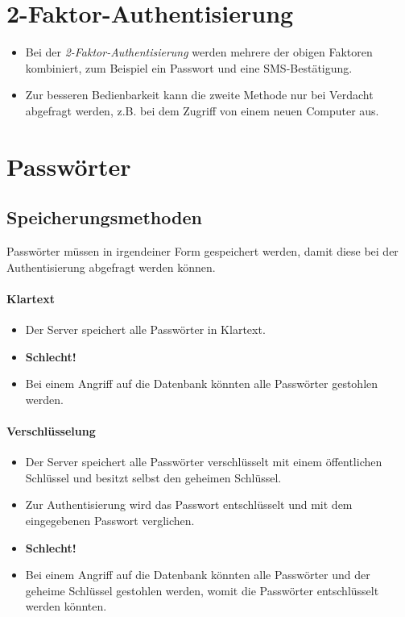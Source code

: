 \documentclass[a4paper, 11pt, accentcolor = tud3b]{tudreport}
\begin{document}
        \section{2-Faktor-Authentisierung}
	        \begin{itemize}
	        	\item Bei der \textit{2-Faktor-Authentisierung} werden mehrere der obigen Faktoren kombiniert, zum Beispiel ein Passwort und eine SMS-Bestätigung.
	        	\item Zur besseren Bedienbarkeit kann die zweite Methode nur bei Verdacht abgefragt werden, z.B. bei dem Zugriff von einem neuen Computer aus.
	        \end{itemize}

        \section{Passwörter}
            \subsection{Speicherungsmethoden}
	            Passwörter müssen in irgendeiner Form gespeichert werden, damit diese bei der Authentisierung abgefragt werden können.
            
                \paragraph{Klartext}
                    \begin{itemize}
	                    \item Der Server speichert alle Passwörter in Klartext.
	                    \item \textbf{Schlecht!}
                    	\item Bei einem Angriff auf die Datenbank könnten alle Passwörter gestohlen werden.
                    \end{itemize}

                \paragraph{Verschlüsselung}
                    \begin{itemize}
                    	\item Der Server speichert alle Passwörter verschlüsselt mit einem öffentlichen Schlüssel und besitzt selbst den geheimen Schlüssel.
                    	\item Zur Authentisierung wird das Passwort entschlüsselt und mit dem eingegebenen Passwort verglichen.
                    	\item \textbf{Schlecht!}
                    	\item Bei einem Angriff auf die Datenbank könnten alle Passwörter und der geheime Schlüssel gestohlen werden, womit die Passwörter entschlüsselt werden könnten.
                    \end{itemize}
\end{document}
